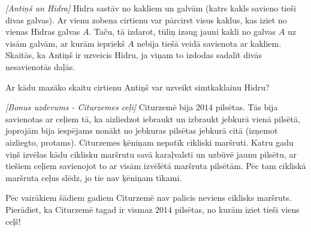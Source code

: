 \begin{problem}
\textit{[Antiņš un Hidra]}
Hidra sastāv no kakliem un galvām (katrs kakls savieno tieši divas galvas). Ar vienu zobena cirtienu var pārcirst visus kaklus, kas iziet no vienas Hidras galvas $A$. Taču, tā izdarot, tūliņ izaug jauni kakli no galvas $A$ uz visām galvām, ar kurām iepriekš $A$ nebija tiešā veidā savienota ar kakliem. 
Skaitās, ka Antiņš ir uzveicis Hidru, ja viņam to izdodas sadalīt divās nesavienotās daļās. 

Ar kādu mazāko skaitu cirtienu Antiņš var uzveikt simtkaklainu Hidru?

\end{problem}
%

\begin{problem}
\textit{[Bonus uzdevums - Citurzemes ceļi]}
Citurzemē bija $2014$ pilsētas. Tās bija savienotas ar ceļiem tā, ka aizliedzot iebraukt un izbraukt jebkurā vienā pilsētā, joprojām bija iespējams nonākt no jebkuras pilsētas jebkurā citā (izņemot aizliegto, protams). 
Citurzemes ķēniņam nepatīk cikliski maršruti. Katru gadu viņš izvēlas kādu ciklisku maršrutu savā karaļvalstī un uzbūvē jaunu pilsētu, ar tiešiem ceļiem savienojot to ar visām izvēlētā maršruta 
pilsētām. Pēc tam cikliskā maršruta ceļus slēdz, jo tie nav ķēniņam tīkami.

Pēc vairākiem šādiem gadiem Citurzemē nav palicis neviens ciklisks maršruts. Pierādiet, ka Citurzemē tagad ir vismaz $2014$ pilsētas, no kurām iziet tieši viens ceļš!

\end{problem}
%

%
%
%
% 
%



